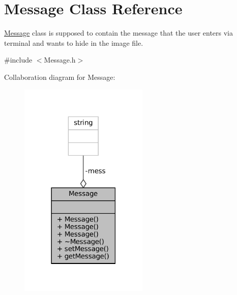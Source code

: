 \hypertarget{classMessage}{}\section{Message Class Reference}
\label{classMessage}


\mbox{\hyperlink{classMessage}{Message}} class is supposed to contain the message that the user enters via terminal and wants to hide in the image file.  




{\ttfamily \#include $<$Message.\+h$>$}



Collaboration diagram for Message\+:
\nopagebreak
\begin{figure}[H]
\begin{center}
\leavevmode
\includegraphics[width=174pt]{classMessage__coll__graph}
\end{center}
\end{figure}
